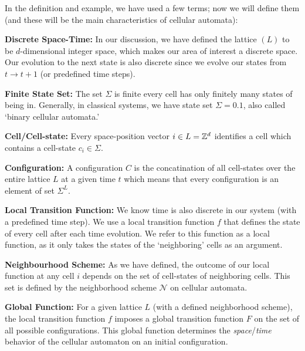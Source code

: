 \documentclass[11pt, oneside, listof=totoc]{scrbook}
\begin{document}
In the definition and example, we have used a few terms; now we will define them (and these will be the main characteristics of cellular automata):
\begin{list}{}{}
    \item[\bfseries Discrete Space-Time:] In our discussion, we have defined the lattice \((L)\) to be \(d\)-dimensional integer space, which makes our area of interest a discrete space. Our evolution to the next state is also discrete since we evolve our states from \(t \to t+1\) (or predefined time steps).

    \item[\bfseries Finite State Set:] The set \(\Sigma\) is finite \ie every cell has only finitely many states of being in. Generally, in classical systems, we have state set \(\Sigma = \qty{0, 1}\), also called `binary cellular automata.'

    \item[\bfseries Cell/Cell-state:] Every space-position vector \(i \in L = \mathbb Z^d\) identifies a cell which contains a cell-state \(c_i \in \Sigma\).

    \item[\bfseries Configuration:] A configuration \(C\) is the concatination of all cell-states over the entire lattice \(L\) at a given time \(t\) which means that every configuration is an element of set \(\Sigma^L\).

    \item[\bfseries Local Transition Function:] We know time is also discrete in our system (with a predefined time step). We use a local transition function \(f\) that defines the state of every cell after each time evolution. We refer to this function as a local function, as it only takes the states of the `neighboring' cells as an argument.

    \item[\bfseries Neighbourhood Scheme:] As we have defined, the outcome of our local function at any cell \(i\) depends on the set of cell-states of neighboring cells. This set is defined by the neighborhood scheme \(\mathcal{N}\) on cellular automata.

    \item[\bfseries Global Function:] For a given lattice \(L\) (with a defined neighborhood scheme), the local transition function \(f\) imposes a global transition function \(F\) on the set of all possible configurations. This global function determines the \emph{space}/\emph{time} behavior of the cellular automaton on an initial configuration.
\end{list}
\end{document}
